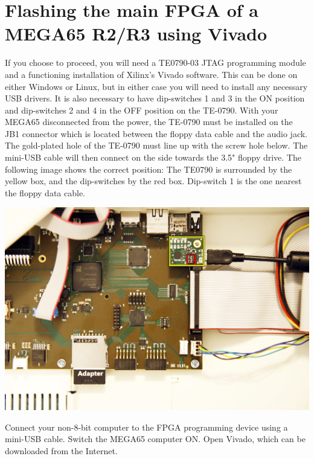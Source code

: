 \section{Flashing the main FPGA of a MEGA65 R2/R3 using Vivado}
\label{sec:mainfpgaflashing}

If you choose to proceed, you will need a TE0790-03 JTAG programming module and a functioning
installation of Xilinx's Vivado software.  This can be done on either Windows or Linux, but
in either case you will need to install any necessary USB drivers. It is
also necessary to have
dip-switches 1 and 3 in the ON position and dip-switches 2 and 4 in the
OFF position on the TE-0790.
With your MEGA65 disconnected from the power, the TE-0790 must be
installed on the JB1 connector which is located between the floppy data cable and the audio jack.
The gold-plated hole of the TE-0790 must line up with the screw
hole below.  The mini-USB cable will then connect on the side towards the 3.5" floppy drive.
The following image shows the correct position: The TE0790 is surrounded by the yellow box,
and the dip-switches by the red box. Dip-switch 1 is the one nearest the floppy data cable.

\includegraphics[width=\linewidth]{images/jtag_detail_02.jpg}

Connect your non-8-bit computer to the FPGA programming device using a
mini-USB cable. Switch the MEGA65 computer ON. Open Vivado, which can
be downloaded from the Internet.

\newpage


